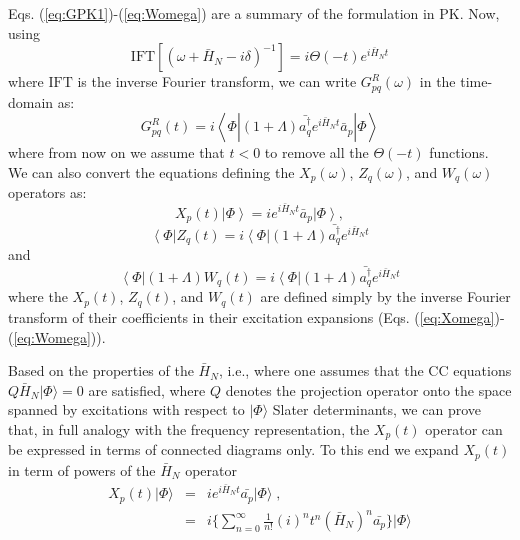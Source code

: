 \documentclass[aps,prb,preprint,groupaddress,floatfix]{revtex4}
\begin{document}
Eqs. (\ref{eq:GPK1})-(\ref{eq:Womega}) are a summary of the formulation in PK. Now, using
\begin{equation}
\mathrm{IFT}\left[\left( \omega + \bar{H}_N -i\delta \right)^{-1} \right] =
i \Theta(-t) e^{i \bar{H}_N t}
\end{equation}
where $\mathrm{IFT}$ is the inverse Fourier transform, we can write
$G^R_{pq} (\omega)$ in the time-domain as:
\begin{equation}
G^R_{pq}(t) = i \left< \Phi \left| (1+\Lambda) \bar{a^{\dagger}_q}
e^{i \bar{H}_N t}
\bar{a}_p \right| \Phi \right>
\end{equation}
where from now on we assume that $t<0$ to remove all the $\Theta(-t)$ functions.
We can also convert the equations defining the $X_p(\omega)$, $Z_q(\omega)$,
and $W_q(\omega)$ operators as:
\begin{equation}
\label{eq:xpt}
X_{p}(t) \left| \Phi \right> = 
i e^{i \bar{H}_N t}
\bar{a}_p \left| \Phi \right>,
\end{equation}
\begin{equation}
\label{eq:zqt}
\left< \Phi \right| Z_{q}(t) = 
i \left< \Phi \right| (1+\Lambda) \bar{a^{\dagger}_q}
e^{i \bar{H}_N t}
\end{equation}
and
\begin{equation}
\label{eq:wqt}
\left< \Phi \right| (1+\Lambda)W_{q}(t) = 
i \left< \Phi \right| (1+\Lambda) \bar{a^{\dagger}_q}
e^{i \bar{H}_N t}
\end{equation}
where the $X_p(t)$, $Z_q(t)$, and $W_q(t)$ are defined simply by the inverse
Fourier transform of their coefficients in their excitation expansions (Eqs. (\ref{eq:Xomega})-(\ref{eq:Womega})).

Based on the properties of the $\bar{H}_N$, i.e., where one assumes that the CC
equations $Q\bar{H}_N|\Phi\rangle = 0$ are satisfied, where $Q$ denotes the
projection operator onto the space spanned by excitations with respect to
$|\Phi\rangle$ Slater determinants, we can prove that, in full analogy with
the frequency representation, the $X_p(t)$ operator can be expressed in terms
of connected diagrams only. To this end we expand $X_p(t)$ in term of powers of
the $\bar{H}_N$ operator
\begin{eqnarray}
X_p(t)|\Phi\rangle &=& ie^{i\bar{H}_Nt} \bar{a_p}|\Phi\rangle \;, \label{step1} \\
&=& i \lbrace \sum_{n=0}^{\infty} \frac{1}{n!} (i)^n t^n (\bar{H}_N)^n \bar{a_p}\rbrace |\Phi\rangle \label{step4} 
\end{eqnarray}
\end{document}

